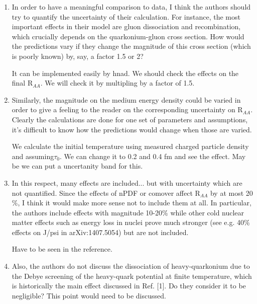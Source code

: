 \documentclass[aps,prc,preprint,superscriptaddress,showpacs,showkeys]{revtex4-1}
\begin{document}
\begin{enumerate}

\item { \color{red} In order to have a meaningful comparison to data, I think the
authors should try to quantify the uncertainty of their calculation.
For instance, the most important effects in their model are gluon
dissociation and recombination, which crucially depends on the
quarkonium-gluon cross section. How would the predictions vary if they
change the magnitude of this cross section (which is poorly known) by,
say, a factor 1.5 or 2?}

{ \color{blue} It can be implemented easily by hnad. We should check the effects on the final R$_{AA}$. We will check it by multipling by
a factor of 1.5.}

\item { \color{red} Similarly, the magnitude on the medium energy density could be
varied in order to give a feeling to the reader on the corresponding
uncertainty on R$_{AA}$. Clearly the calculations are done for one set
of parameters and assumptions, it's difficult to know how the
predictions would change when those are varied.}

{ \color{blue} We calculate the initial temperature using 
measured charged particle density and assuming$\tau_0$. We 
can change it to 0.2 and 0.4 fm and see the effect. May be
we can put a uncertanity band for this.

}

\item { \color{red} In this respect, many effects are included... but with uncertainty
which are not quantified. Since the effects of nPDF or comover affect
R$_{AA}$ by at most 20$\%$, I think it would make more sense not to include
them at all. In particular, the authors include effects with magnitude
10-20$\%$ while other cold nuclear matter effects such as energy loss in
nuclei prove much stronger (see e.g. 40$\%$ effects on J/psi in
arXiv:1407.5054) but are not included.}

{ \color{blue} Have to be seen in the reference. }


\item { \color{red} Also, the authors do not discuss the dissociation of
heavy-quarkonium due to the Debye screening of the heavy-quark
potential at finite temperature, which is historically the main effect
discussed in Ref. [1]. Do they consider it to be negligible? This
point would need to be discussed.}



\end{enumerate}
\end{document}
